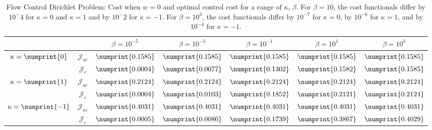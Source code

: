 \begin{table}
\centering
\begin{tabular}{ | c | c || c | c | c | c | c ||}
\hline
\multicolumn{2}{|c||}{}& $\beta = 10^{-5}$ & $\beta = 10^{-3}$ & $\beta = 10^{-1}$ & $\beta = 10^{1}$ & $\beta = 10^{3}$  \\
\hline
\hline
\multirow{2}{*}{$\kappa= \numprint{0}$}  & $\mathcal{J}_{uc}$ & $\numprint{0.1585}$ & $\numprint{0.1585}$ & $\numprint{0.1585}$ & $\numprint{0.1585}$ & $\numprint{0.1585}$\\
 & $\mathcal{J}_c$ & $\numprint{0.0004}$ & $\numprint{0.0077}$ & $\numprint{0.1302}$ & $\numprint{0.1582}$ & $\numprint{0.1585}$\\
\hline
\multirow{2}{*}{$\kappa= \numprint{1}$}  & $\mathcal{J}_{uc}$ & $\numprint{0.2124}$ & $\numprint{0.2124}$ & $\numprint{0.2124}$ & $\numprint{0.2124}$ & $\numprint{0.2124}$\\
 & $\mathcal{J}_c$ & $\numprint{0.0004}$ & $\numprint{0.0103}$ & $\numprint{0.1852}$ & $\numprint{0.2121}$ & $\numprint{0.2124}$\\
\hline
\multirow{2}{*}{$\kappa= \numprint{-1}$}  & $\mathcal{J}_{uc}$ & $\numprint{0.4031}$ & $\numprint{0.4031}$ & $\numprint{0.4031}$ & $\numprint{0.4031}$ & $\numprint{0.4031}$\\
 & $\mathcal{J}_c$ & $\numprint{0.0005}$ & $\numprint{0.0086}$ & $\numprint{0.1739}$ & $\numprint{0.3867}$ & $\numprint{0.4029}$\\
\hline
\end{tabular}
\caption{Flow Control Dirichlet Problem: Cost when $w=0$ and optimal control cost for a range of $\kappa$, $\beta$. For $\beta = 10$, the cost functionals differ by $10^-4$ for $\kappa = 0$ and $\kappa = 1$ and by $10^-2$ for $\kappa = -1$. For $\beta = 10^3$, the cost functionals differ by $10^{-7}$ for $\kappa = 0$, by $10^{-6}$ for $\kappa = 1$, and by $10^{-4}$ for $\kappa = -1$.}
\label{TabFCD}
\end{table}